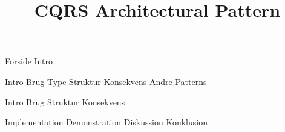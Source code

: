 \documentclass[a4paper,openany]{memoir}
\title{CQRS Architectural Pattern}
\begin{document}
	{Forside}  \newpage
	\tableofcontents\thispagestyle{fancy}  \newpage
	{Intro}  \newpage

	{Intro}
	{Brug}
	{Type}
	{Struktur}
	{Konsekvens}
	{Andre-Patterns}
	
	{Intro}
	{Brug}
	{Struktur}
	{Konsekvens}

	{Implementation}
	{Demonstration}
	{Diskussion}
	{Konklusion}\newpage

	\listoffigures

	\printbibliography

	
\end{document}
